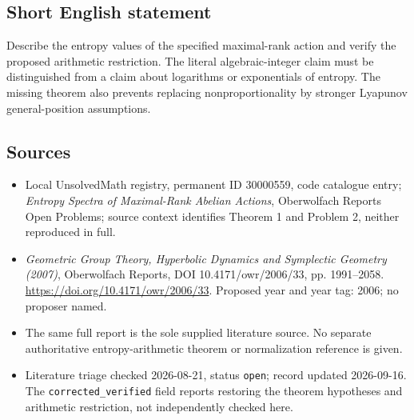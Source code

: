 \documentclass[11pt]{article}
\begin{document}
\subsection{Short English statement}
Describe the entropy values of the specified maximal-rank action and verify the proposed arithmetic restriction. The literal algebraic-integer claim must be distinguished from a claim about logarithms or exponentials of entropy. The missing theorem also prevents replacing nonproportionality by stronger Lyapunov general-position assumptions.
\subsection{Sources}
\begin{itemize}\item Local UnsolvedMath registry, permanent ID 30000559, code catalogue entry; \emph{Entropy Spectra of Maximal-Rank Abelian Actions}, Oberwolfach Reports Open Problems; source context identifies Theorem 1 and Problem 2, neither reproduced in full.\item \emph{Geometric Group Theory, Hyperbolic Dynamics and Symplectic Geometry (2007)}, Oberwolfach Reports, DOI 10.4171/owr/2006/33, pp. 1991--2058. \url{https://doi.org/10.4171/owr/2006/33}. Proposed year and year tag: 2006; no proposer named.\item The same full report is the sole supplied literature source. No separate authoritative entropy-arithmetic theorem or normalization reference is given.\item Literature triage checked 2026-08-21, status \texttt{open}; record updated 2026-09-16. The \texttt{corrected\_verified} field reports restoring the theorem hypotheses and arithmetic restriction, not independently checked here.\end{itemize}
\end{document}
